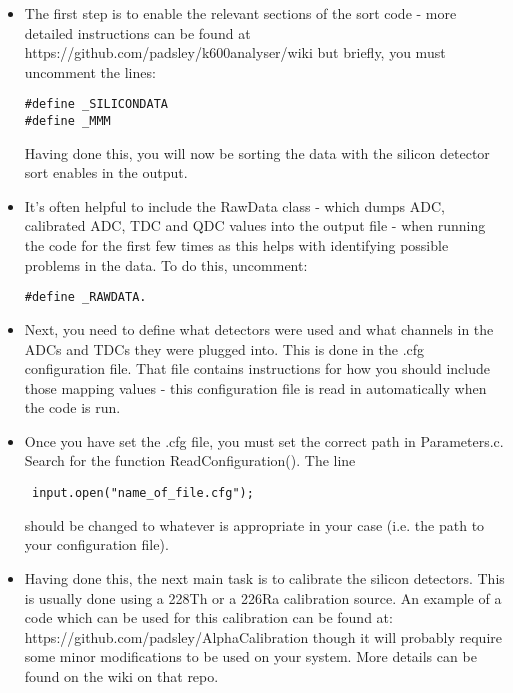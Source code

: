 \documentclass[11pt]{report}
\begin{document}
\begin{itemize}
\item The first step is to enable the relevant sections of the sort code - more detailed instructions can be found at 
https://github.com/padsley/k600analyser/wiki but briefly, you must uncomment the lines:

\begin{verbatim} 
#define _SILICONDATA
#define _MMM
\end{verbatim}

\noindent Having done this, you will now be sorting the data with the silicon detector sort enables in the output.

\item It’s often helpful to include the RawData class - which dumps ADC, calibrated ADC, TDC and QDC values into the output file - when running the code for the first few times as this helps with identifying possible problems in the data. To do this, uncomment:

\begin{verbatim}
#define _RAWDATA. 
\end{verbatim}

\item Next, you need to define what detectors were used and what channels in the ADCs and TDCs they were plugged into. This is done in the .cfg configuration file. That file contains instructions for how you should include those mapping values - this configuration file is read in automatically when the code is run.

\item Once you have set the .cfg file, you must set the correct path in Parameters.c. Search for the function ReadConfiguration(). The line

\begin{verbatim}
 input.open("name_of_file.cfg");
\end{verbatim}

\noindent should be changed to whatever is appropriate in your case (i.e. the path to your configuration file).

\item Having done this, the next main task is to calibrate the silicon detectors. This is usually done using a 228Th or a 226Ra calibration source. An example of a code which can be used for this calibration can be found at: https://github.com/padsley/AlphaCalibration though it will probably require some minor modifications to be used on your system. More details can be found on the wiki on that repo.


\end{itemize}
\end{document}

